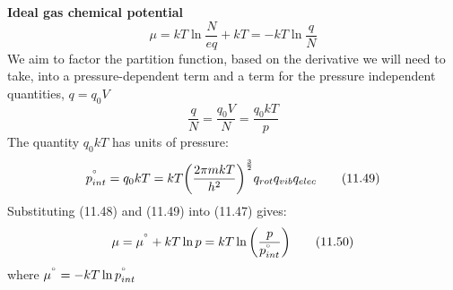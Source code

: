 \documentclass[8pt]{article}
\numberwithin{equation}{section}
\begin{document}
\begin{multicols}{2}
\textbf{Ideal gas chemical potential}
\begin{equation}
\mu=kT\ln{\frac{N}{eq}}+kT=-kT\ln{\frac{q}{N}} \tag{11.47}
\end{equation}
We aim to factor the partition function, based on the derivative we will need to take, into a pressure-dependent term and a term for the pressure independent quantities, $q=q_{0}V$
\begin{equation}
\frac{q}{N}=\frac{q_{0}V}{N}=\frac{q_{0}kT}{p} \tag{11.48}
\end{equation}
The quantity $q_{0}kT$ has units of pressure: 
\begin{equation}
p_{int}^{\degree}=q_{0}kT=kT\bigg(\frac{2\pi mkT}{h^{2}}\bigg)^{\frac{3}{2}}q_{rot}q_{vib}q_{elec} \tag{11.49}
\end{equation}
Substituting (11.48) and (11.49) into (11.47) gives: 
\begin{equation}
\mu=\mu^{\degree}+kT\ln{p}=kT\ln{\bigg(\frac{p}{p_{int}^{\degree}}\bigg)} \tag{11.50}
\end{equation}
where $\mu^{\degree}=-kT\ln{p_{int}^{\degree}}$
\setcounter{section}{12}

\end{multicols}
\end{document}
